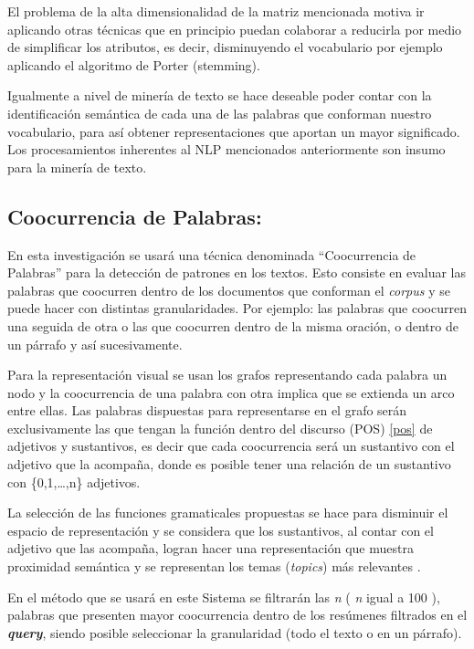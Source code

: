 \documentclass[
  10,
  openany]{book}
\begin{document}
El problema de la alta dimensionalidad de la matriz mencionada motiva ir aplicando otras técnicas que en principio puedan colaborar a reducirla por medio de simplificar los atributos, es decir, disminuyendo el vocabulario por ejemplo aplicando el algoritmo de Porter (stemming).

Igualmente a nivel de minería de texto se hace deseable poder contar con la identificación semántica de cada una de las palabras que conforman nuestro vocabulario, para así obtener representaciones que aportan un mayor significado. Los procesamientos inherentes al NLP mencionados anteriormente son insumo para la minería de texto.

\hypertarget{coocurrencia}{%
\subsection{Coocurrencia de Palabras:}\label{coocurrencia}}

En esta investigación se usará una técnica denominada ``Coocurrencia de Palabras'' para la detección de patrones en los textos. Esto consiste en evaluar las palabras que coocurren dentro de los documentos que conforman el \emph{corpus} y se puede hacer con distintas granularidades. Por ejemplo: las palabras que coocurren una seguida de otra o las que coocurren dentro de la misma oración, o dentro de un párrafo y así sucesivamente.

Para la representación visual se usan los grafos representando cada palabra un nodo y la coocurrencia de una palabra con otra implica que se extienda un arco entre ellas. Las palabras dispuestas para representarse en el grafo serán exclusivamente las que tengan la función dentro del discurso (POS) \ref{pos} de adjetivos y sustantivos, es decir que cada coocurrencia será un sustantivo con el adjetivo que la acompaña, donde es posible tener una relación de un sustantivo con \{0,1,\ldots,n\} adjetivos.

La selección de las funciones gramaticales propuestas se hace para disminuir el espacio de representación y se considera que los sustantivos, al contar con el adjetivo que las acompaña, logran hacer una representación que muestra proximidad semántica y se representan los temas (\emph{topics}) más relevantes \citep{segev2021}.

En el método que se usará en este Sistema se filtrarán las \emph{n} ( \emph{n} igual a 100 ), palabras que presenten mayor coocurrencia dentro de los resúmenes filtrados en el \textbf{\emph{query}}, siendo posible seleccionar la granularidad (todo el texto o en un párrafo).
\end{document}
